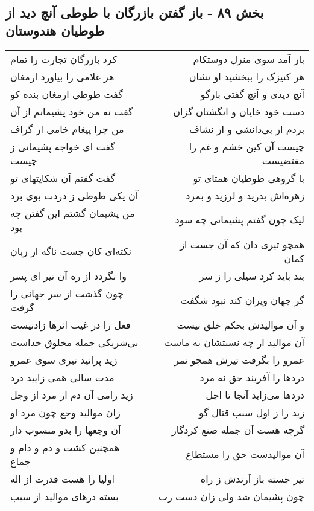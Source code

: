 \begin{center}
\section*{بخش ۸۹ - باز گفتن بازرگان با طوطی آنچ دید از طوطیان هندوستان}
\label{sec:sh089}
\begin{longtable}{l p{0.5cm} r}
کرد بازرگان تجارت را تمام
&&
باز آمد سوی منزل دوستکام
\\
هر غلامی را بیاورد ارمغان
&&
هر کنیزک را ببخشید او نشان
\\
گفت طوطی ارمغان بنده کو
&&
آنچ دیدی و آنچ گفتی بازگو
\\
گفت نه من خود پشیمانم از آن
&&
دست خود خایان و انگشتان گزان
\\
من چرا پیغام خامی از گزاف
&&
بردم از بی‌دانشی و از نشاف
\\
گفت ای خواجه پشیمانی ز چیست
&&
چیست آن کین خشم و غم را مقتضیست
\\
گفت گفتم آن شکایتهای تو
&&
با گروهی طوطیان همتای تو
\\
آن یکی طوطی ز دردت بوی برد
&&
زهره‌اش بدرید و لرزید و بمرد
\\
من پشیمان گشتم این گفتن چه بود
&&
لیک چون گفتم پشیمانی چه سود
\\
نکته‌ای کان جست ناگه از زبان
&&
همچو تیری دان که آن جست از کمان
\\
وا نگردد از ره آن تیر ای پسر
&&
بند باید کرد سیلی را ز سر
\\
چون گذشت از سر جهانی را گرفت
&&
گر جهان ویران کند نبود شگفت
\\
فعل را در غیب اثرها زادنیست
&&
و آن موالیدش بحکم خلق نیست
\\
بی‌شریکی جمله مخلوق خداست
&&
آن موالید ار چه نسبتشان به ماست
\\
زید پرانید تیری سوی عمرو
&&
عمرو را بگرفت تیرش همچو نمر
\\
مدت سالی همی زایید درد
&&
دردها را آفریند حق نه مرد
\\
زید رامی آن دم ار مرد از وجل
&&
دردها می‌زاید آنجا تا اجل
\\
زان موالید وجع چون مرد او
&&
زید را ز اول سبب قتال گو
\\
آن وجعها را بدو منسوب دار
&&
گرچه هست آن جمله صنع کردگار
\\
همچنین کشت و دم و دام و جماع
&&
آن موالیدست حق را مستطاع
\\
اولیا را هست قدرت از اله
&&
تیر جسته باز آرندش ز راه
\\
بسته درهای موالید از سبب
&&
چون پشیمان شد ولی زان دست رب
\\

\end{longtable}
\end{center}
